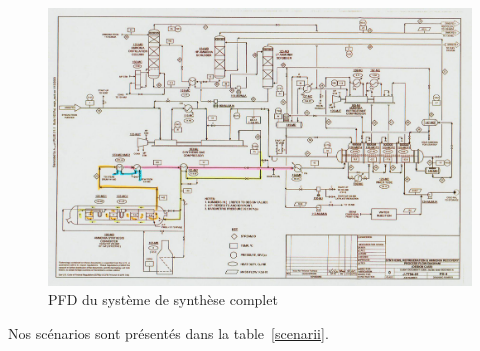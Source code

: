 \begin{figure}
\includegraphics[width=\textwidth]{img/hazop3}
\caption{PFD du système de synthèse complet}
\label{ann4}
\end{figure}

Nos scénarios sont présentés dans la table~\ref{scenarii}.

